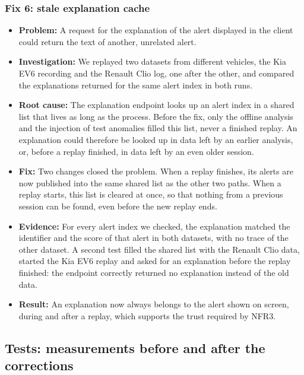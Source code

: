 \subsubsection{Fix 6: stale explanation cache}
\label{sec:validation-ai}

\begin{itemize}
    \item \textbf{Problem:} A request for the explanation of the alert displayed in the client could return the text of another, unrelated alert.
    \item \textbf{Investigation:} We replayed two datasets from different vehicles, the Kia EV6 recording and the Renault Clio log, one after the other, and compared the explanations returned for the same alert index in both runs.
    \item \textbf{Root cause:} The explanation endpoint looks up an alert index in a shared list that lives as long as the process. Before the fix, only the offline analysis and the injection of test anomalies filled this list, never a finished replay. An explanation could therefore be looked up in data left by an earlier analysis, or, before a replay finished, in data left by an even older session.
    \item \textbf{Fix:} Two changes closed the problem. When a replay finishes, its alerts are now published into the same shared list as the other two paths. When a replay starts, this list is cleared at once, so that nothing from a previous session can be found, even before the new replay ends.
    \item \textbf{Evidence:} For every alert index we checked, the explanation matched the identifier and the score of that alert in both datasets, with no trace of the other dataset. A second test filled the shared list with the Renault Clio data, started the Kia EV6 replay and asked for an explanation before the replay finished: the endpoint correctly returned no explanation instead of the old data.
    \item \textbf{Result:} An explanation now always belongs to the alert shown on screen, during and after a replay, which supports the trust required by NFR3.
\end{itemize}

\subsection{Tests: measurements before and after the corrections}
\label{sec:validation-beforeafter}

